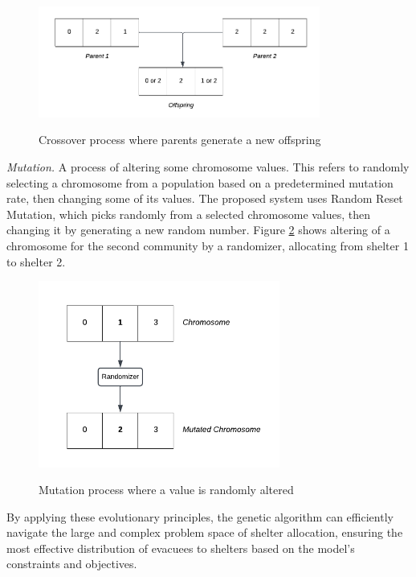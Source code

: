 	\begin{figure}[h!]
		\caption{Crossover process where parents generate a new offspring}
		\centering
		\includegraphics[width=350px]{Crossover}
		\label{Crossover}
	\end{figure}
	
	\textit{Mutation.} A process of altering some chromosome values. This refers to randomly selecting a chromosome from a population based on a predetermined mutation rate, then changing some of its values. The proposed system uses Random Reset Mutation, which picks randomly from a selected chromosome values, then changing it by generating a new random number. Figure \ref{Mutation} shows altering of a chromosome for the second community by a randomizer, allocating from shelter 1 to shelter 2.
	
	\begin{figure}[h!]
		\caption{Mutation process where a value is randomly altered}
		\centering
		\includegraphics[width=300px]{Mutation}
		\label{Mutation}
	\end{figure}
	
	By applying these evolutionary principles, the genetic algorithm can efficiently navigate the large and complex problem space of shelter allocation, ensuring the most effective distribution of evacuees to shelters based on the model’s constraints and objectives.
	

	
	
